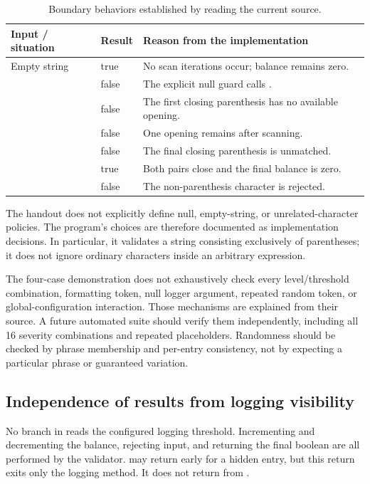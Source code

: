 \begin{table}[H]
\centering\small
\begin{tabularx}{\textwidth}{@{}p{}p{}Y@{}}
\toprule
\textbf{Input / situation} & \textbf{Result} & \textbf{Reason from the implementation}\\
\midrule
Empty string & true & No scan iterations occur; balance remains zero.\\
 & false & The explicit null guard calls .\\
\code{)(} & false & The first closing parenthesis has no available opening.\\
\code{(()} & false & One opening remains after scanning.\\
\code{())} & false & The final closing parenthesis is unmatched.\\
\code{()()} & true & Both pairs close and the final balance is zero.\\
 & false & The non-parenthesis character is rejected.\\
\bottomrule
\end{tabularx}
\caption{Boundary behaviors established by reading the current source.}
\end{table}

The handout does not explicitly define null, empty-string, or unrelated-character policies. The program's choices are therefore documented as implementation decisions. In particular, it validates a string consisting exclusively of parentheses; it does not ignore ordinary characters inside an arbitrary expression.

The four-case demonstration does not exhaustively check every level/threshold combination, formatting token, null logger argument, repeated random token, or global-configuration interaction. Those mechanisms are explained from their source. A future automated suite should verify them independently, including all 16 severity combinations and repeated placeholders. Randomness should be checked by phrase membership and per-entry consistency, not by expecting a particular phrase or guaranteed variation.

\subsection{Independence of results from logging visibility}
No branch in  reads the configured logging threshold. Incrementing and decrementing the balance, rejecting input, and returning the final boolean are all performed by the validator.  may return early for a hidden entry, but this return exits only the logging method. It does not return from .

